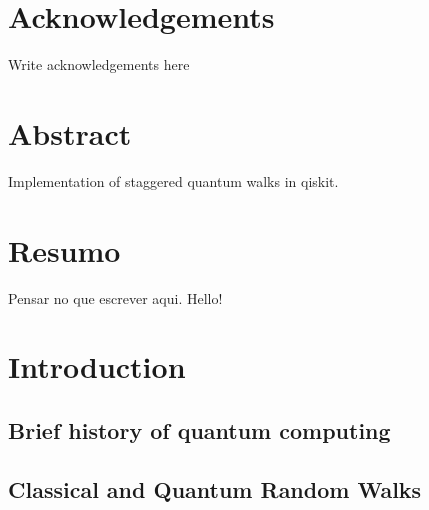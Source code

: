 \documentclass[
oneside,
11pt, a4paper,
footinclude=true,
headinclude=true,
cleardoublepage=empty
]{scrbook}
\author{Jaime Santos}
\date{\myear} %
\begin{document}
\umfrontcover	
\umtitlepage

\chapter*{Acknowledgements}
Write acknowledgements here


\chapter*{Abstract}
Implementation of staggered quantum walks in qiskit.

\cleardoublepage
\chapter*{Resumo}
Pensar no que escrever aqui.
Hello!	

\tableofcontents
\listoffigures
\listoftables



\chapter{Introduction}

\section{Brief history of quantum computing}

\section{Classical and Quantum Random Walks}

\end{document}
